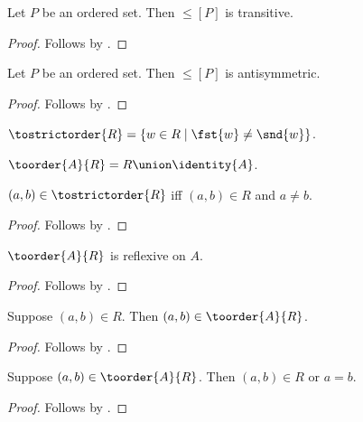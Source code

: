 \begin{proposition}\label{ordered_set_order_transitive}
    Let $P$ be an ordered set.
    Then $\leq[P]$ is transitive.
\end{proposition}
\begin{proof}
    Follows by .
\end{proof}

\begin{proposition}\label{ordered_set_order_antisymmetric}
    Let $P$ be an ordered set.
    Then $\leq[P]$ is antisymmetric.
\end{proposition}
\begin{proof}
    Follows by .
\end{proof}

\begin{definition}\label{tostrictorder}
    $\tostrictorder{R} = \{w\in R\mid \fst{w}\neq\snd{w}\}$.
\end{definition}

\begin{definition}\label{toorder}
    $\toorder{A}{R} = R\union\identity{A}$.
\end{definition}

\begin{proposition}\label{tostrictorder_iff}
    $(a,b)\in\tostrictorder{R}$ iff $(a,b)\in R$ and $a\neq b$.
\end{proposition}
\begin{proof}
    Follows by .
\end{proof}

\begin{proposition}\label{toorder_reflexive}
    $\toorder{A}{R}$ is reflexive on $A$.
\end{proposition}
\begin{proof}
    Follows by .
\end{proof}

\begin{proposition}\label{toorder_intro}
    Suppose $(a,b)\in R$.
    Then $(a,b)\in\toorder{A}{R}$.
\end{proposition}
\begin{proof}
    Follows by .
\end{proof}

\begin{proposition}\label{toorder_elim}
    Suppose $(a,b)\in\toorder{A}{R}$.
    Then $(a,b)\in R$ or $a = b$.
\end{proposition}
\begin{proof}
    Follows by .
\end{proof}

